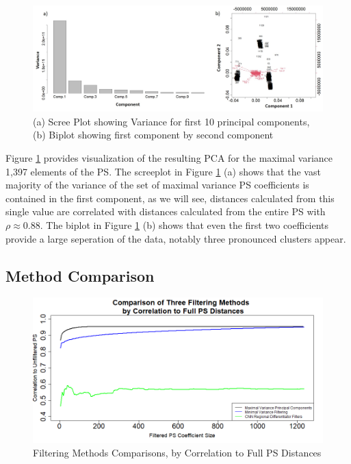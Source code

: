 \documentclass[10pt,conference]{IEEEtran}
\begin{document}
\begin{figure}[h!] 
\centering
\caption{(a) Scree Plot showing Variance for first 10 principal components, (b) Biplot showing first component by second component \label{fig:PCAres}}
\includegraphics[scale=0.26]{Images/Files/PCAResults.jpg}
\end{figure} 

Figure \ref{fig:PCAres} provides visualization of the resulting PCA for the maximal
variance 1,397 elements of the PS.  The screeplot in Figure \ref{fig:PCAres} (a) 
shows that the vast majority of the variance of the set of maximal variance PS 
coefficients is contained in the first component, as we will see, distances calculated from this single value are correlated with distances calculated from the entire PS with $\rho \approx 0.88$.  The biplot in Figure \ref{fig:PCAres} (b) shows that even the first two coefficients provide a large seperation of the data, notably three pronounced clusters appear.

\subsection{Method Comparison} 

\begin{figure}[h!]
\centering
\includegraphics[scale=0.25]{Images/Files/PSFiltMethods.PNG}
\caption{Filtering Methods Comparisons, by Correlation to Full PS Distances \label{fig:filtcomp}}
\end{figure}
\end{document}
